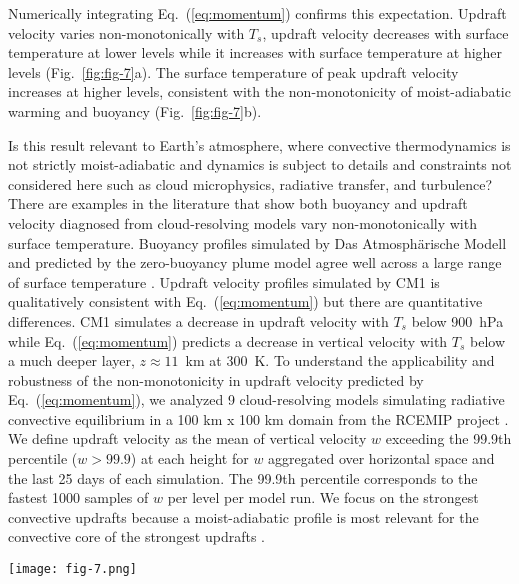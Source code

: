 \documentclass[]{ametsocV6.1}
\begin{document}
Numerically integrating Eq.~(\ref{eq:momentum}) confirms this expectation. Updraft velocity varies non-monotonically with $T_s$, updraft velocity decreases with surface temperature at lower levels while it increases with surface temperature at higher levels (Fig.~\ref{fig:fig-7}a). The surface temperature of peak updraft velocity increases at higher levels, consistent with the non-monotonicity of moist-adiabatic warming and buoyancy (Fig.~\ref{fig:fig-7}b).

Is this result relevant to Earth's atmosphere, where convective thermodynamics is not strictly moist-adiabatic and dynamics is subject to details and constraints not considered here such as cloud microphysics, radiative transfer, and turbulence? There are examples in the literature that show both buoyancy and updraft velocity diagnosed from cloud-resolving models vary non-monotonically with surface temperature. Buoyancy profiles simulated by Das Atmosph\"arische Modell and predicted by the zero-buoyancy plume model agree well across a large range of surface temperature \citep[Fig.~2a in][]{seeley2015a}. Updraft velocity profiles simulated by CM1 \cite[Fig.~2 in][]{singh2015} is qualitatively consistent with Eq.~(\ref{eq:momentum}) but there are quantitative differences. CM1 simulates a decrease in updraft velocity with $T_s$ below 900~hPa while Eq.~(\ref{eq:momentum}) predicts a decrease in vertical velocity with $T_s$ below a much deeper layer, $z\approx11$~km at 300~K. To understand the applicability and robustness of the non-monotonicity in updraft velocity predicted by Eq.~(\ref{eq:momentum}), we analyzed 9 cloud-resolving models simulating radiative convective equilibrium in a 100 km x 100 km domain from the RCEMIP project \citep{wing2018}. We define updraft velocity as the mean of vertical velocity $w$ exceeding the 99.9th percentile ($w>{99.9}$) at each height for $w$ aggregated over horizontal space and the last 25 days of each simulation. The 99.9th percentile corresponds to the fastest 1000 samples of $w$ per level per model run. We focus on the strongest convective updrafts because a moist-adiabatic profile is most relevant for the convective core of the strongest updrafts \citep{riehl1958}.

\begin{figure*}[htbp]
 \centering
 \texttt{[image: fig-7.png]}\\
 \caption{(a) Vertical profiles of updraft velocity, calculated by numerically integrating Eq.~(\ref{eq:momentum}) in height using buoyancy $B$ from Eq.~(\ref{eq:buoyancy_def}). Updraft velocity decreases with surface temperature at lower levels while it increases with surface temperature at higher levels. (b) Updraft velocity varies non-monotonically with surface temperature at all levels, e.g. at 5, 10, 15, and 20~km. Updraft velocity peaks at warmer surface temperatures at higher levels consistent with the behavior of buoyancy (Fig.~\ref{fig:fig-6}a) and moist-adiabatic warming (Fig.~\ref{fig:fig-5}).}\label{fig:fig-7}
\end{figure*}
\end{document}
